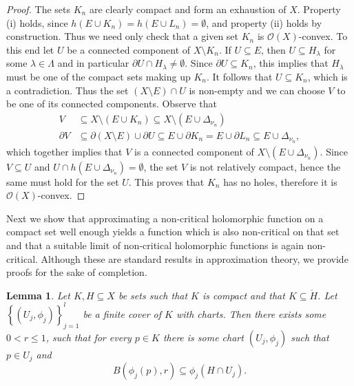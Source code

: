 \documentclass[a4paper,11pt]{amsart}
\newcommand{\set}[1]{\left\{#1\right\}}
\newtheorem{lemma}{Lemma}
\begin{document}
\begin{proof}
    The sets $K_n$ are clearly compact and form an exhaustion of $X$. 
    Property (i) holds, since $h(E \cup K_n) = h(E \cup L_n) = \emptyset$, and property (ii) holds by construction.
    Thus we need only check that a given set $K_n$ is $\mathcal{O}(X)$-convex.
    To this end let $U$ be a connected component of $X \setminus K_n$.
    If $U \subseteq E$, then $U \subseteq H_\lambda$ for some $\lambda \in \Lambda$ and in particular $\partial U \cap H_\lambda \neq \emptyset$.
    Since $\partial U \subseteq K_n$, this implies that $H_\lambda$ must be one of the compact sets making up $K_n$. It follows that $U \subseteq K_n$, which is a contradiction. 
    Thus the set $(X \setminus E) \cap U$ is non-empty and we can choose $V$ to be one of its connected components.
    Observe that 
    \begin{align*}
        V& \subseteq X \setminus (E \cup K_n) \subseteq X \setminus (E \cup \Delta_{\nu_n})\\
        \partial V& \subseteq \partial (X \setminus E) \cup \partial U \subseteq E \cup \partial K_n = E \cup \partial L_n \subseteq E \cup \Delta_{\nu_n},
    \end{align*}
    which together implies that $V$ is a connected component of $X \setminus (E \cup \Delta_{\nu_n})$.
    Since $V \subseteq U$ and $U \cap h(E \cup \Delta_{\nu_n}) = \emptyset$, the set $V$ is not relatively compact, hence the same must hold for the set $U$.
    This proves that $K_n$ has no holes, therefore it is $\mathcal{O}(X)$-convex.
\end{proof}

Next we show that approximating a non-critical holomorphic function on a compact set well enough yields a function which is also non-critical on that set 
and that a suitable limit of non-critical holomorphic functions is again non-critical.
Although these are standard results in approximation theory, we provide proofs for the sake of completion. 

\begin{lemma} \label{exists_r}
    Let $K, H \subseteq X$ be sets such that $K$ is compact and that $K \subseteq \mathring{H}$. 
    Let $\set{(U_j,\phi_j)}_{j=1}^l$ be a finite cover of $K$ with charts. 
    Then there exists some $0 < r \le 1$, such that for every $p \in K$ there is some chart $(U_j, \phi_j)$ such that $p \in U_j$ and
    \[B(\phi_j(p),r) \subseteq \phi_j(H \cap U_j).\] 
\end{lemma}
\end{document}
